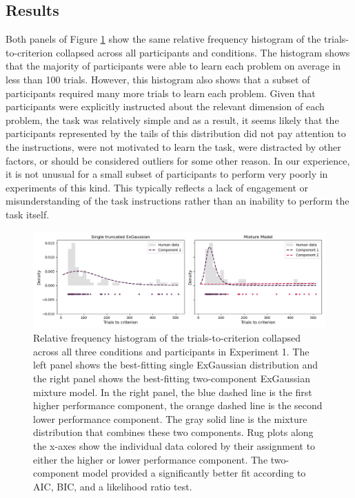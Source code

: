 \documentclass[doc, floatsintext]{apa7}
\begin{document}
\subsection{Results}
Both panels of Figure \ref{fig_mm_hist_1} show the same
relative frequency histogram of the trials-to-criterion
collapsed across all participants and conditions. The
histogram shows that the majority of participants were able
to learn each problem on average in less than 100 trials.
However, this histogram also shows that a subset of
participants required many more trials to learn each
problem. Given that participants were explicitly instructed
about the relevant dimension of each problem, the task was
relatively simple and as a result, it seems likely that the
participants represented by the tails of this distribution
did not pay attention to the instructions, were not
motivated to learn the task, were distracted by other
factors, or should be considered outliers for some other
reason. In our experience, it is not unusual for a small
subset of participants to perform very poorly in experiments
of this kind. This typically reflects a lack of engagement
or misunderstanding of the task instructions rather than an
inability to perform the task itself.

\begin{figure}
  \centering
  \includegraphics[width=1\textwidth]{../figures/fig_exp_1_mm_trunc_exgauss_compare.png}
  \caption{
      Relative frequency histogram of the
      trials-to-criterion collapsed across all three
      conditions and participants in Experiment 1. The left
      panel shows the best-fitting single ExGaussian
      distribution and the right panel shows the
      best-fitting two-component ExGaussian mixture model.
      In the right panel, the blue dashed line is the first
      higher performance component, the orange dashed line
      is the second lower performance component.       The
      gray solid line is the mixture distribution that
      combines these two components. Rug plots along the
      x-axes show the individual data      colored by their
      assignment to either the higher or lower performance
      component. The two-component model provided a
      significantly better fit according to AIC, BIC, and a
      likelihood ratio test.
}
  \label{fig_mm_hist_1}
\end{figure}
\end{document}
